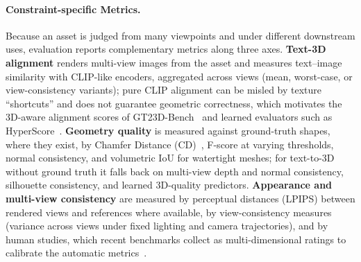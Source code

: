 \paragraph{Constraint-specific Metrics.}
Because an asset is judged from many viewpoints and under different downstream uses, evaluation reports complementary metrics along three axes.
\textbf{Text-3D alignment} renders multi-view images from the asset and measures text--image similarity with CLIP-like encoders, aggregated across views (mean, worst-case, or view-consistency variants); pure CLIP alignment can be misled by texture ``shortcuts'' and does not guarantee geometric correctness, which motivates the 3D-aware alignment scores of GT23D-Bench~\cite{cai2024gt23d} and learned evaluators such as HyperScore~\cite{zhang2025mate3d}.
\textbf{Geometry quality} is measured against ground-truth shapes, where they exist, by Chamfer Distance (CD)~\cite{huang2025spar3d}, F-score at varying thresholds, normal consistency, and volumetric IoU for watertight meshes; for text-to-3D without ground truth it falls back on multi-view depth and normal consistency, silhouette consistency, and learned 3D-quality predictors.
\textbf{Appearance and multi-view consistency} are measured by perceptual distances (LPIPS) between rendered views and references where available, by view-consistency measures (variance across views under fixed lighting and camera trajectories), and by human studies, which recent benchmarks collect as multi-dimensional ratings to calibrate the automatic metrics~\cite{zhang2025mate3d, li2025t23d}.

